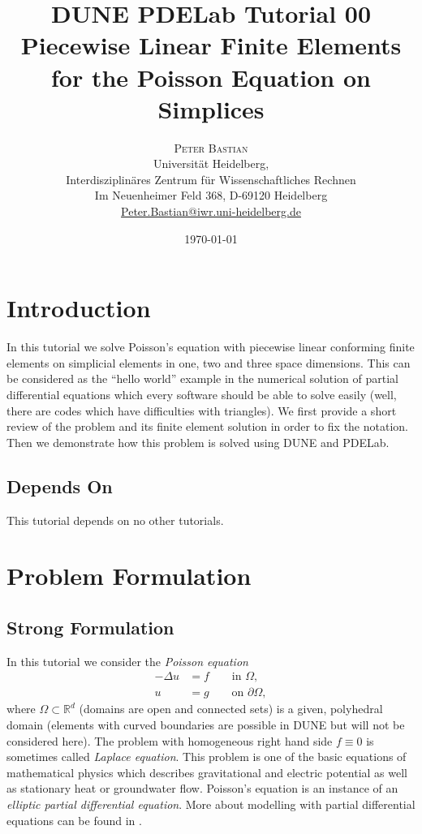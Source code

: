 \documentclass[a4paper,
		     11pt,
		     DIV12,
		     DIVcalc,
		     headings=normal,
		     oneside,
		     bibliography=totoc,
		     headsepline=false,
		     headinclude]{scrartcl}
\title{DUNE PDELab Tutorial 00 \\ Piecewise Linear Finite Elements for the Poisson Equation on Simplices}
\author{\textsc{Peter Bastian}\\
  Universität Heidelberg, \\
  Interdisziplinäres Zentrum für Wissenschaftliches Rechnen\\
  Im Neuenheimer Feld 368, D-69120 Heidelberg\\
  \url{Peter.Bastian@iwr.uni-heidelberg.de}
}
\date{\today}
\begin{document}
\maketitle
\tableofcontents
\clearpage

\section{Introduction}

In this tutorial we solve Poisson's equation with piecewise linear conforming 
finite elements on simplicial elements in one, two and three space dimensions. 
This can be considered as the ``hello world''
example in the numerical solution of partial differential equations which
every software should be able to solve easily (well, there are codes which have
difficulties with triangles). We first provide a short review of the problem and
its finite element solution in order to fix the notation. Then we demonstrate
how this problem is solved using DUNE and PDELab.

\subsection*{Depends On} This tutorial depends on no other tutorials.

\section{Problem Formulation}

\subsection{Strong Formulation}

In this tutorial we consider the {\em Poisson equation}
\begin{subequations}
\begin{align}
-\Delta u & = f \qquad\text{in $\Omega$},\label{eq:1a}\\
u &= g \qquad\text{on $\partial\Omega$},\label{eq:1b}
\end{align}
\end{subequations}
where $\Omega\subset\mathbb{R}^d$ (domains are open and connected sets)
is a given, polyhedral domain (elements with curved
boundaries are possible in DUNE but will not be considered here). 
The problem with homogeneous right hand side $f\equiv 0$ is sometimes called
{\em Laplace equation}. This problem 
is one of the basic equations of mathematical physics which describes gravitational
and electric potential as well as stationary heat or groundwater flow.
Poisson's equation is an instance of an {\em elliptic partial differential equation}.
More about modelling with partial differential equations can be found in \cite{Eriksson,BastianII}.
\end{document}
